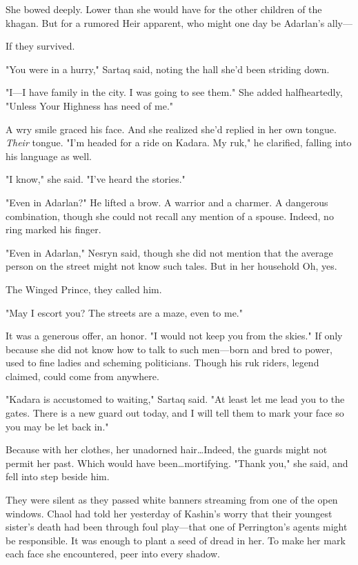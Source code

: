 She bowed deeply. Lower than she would have for the other children of the khagan. But for a rumored Heir apparent, who might one day be Adarlan's ally---

If they survived.

"You were in a hurry," Sartaq said, noting the hall she'd been striding down.

"I---I have family in the city. I was going to see them." She added halfheartedly, "Unless Your Highness has need of me."

A wry smile graced his face. And she realized she'd replied in her own tongue. \emph{Their} tongue. "I'm headed for a ride on Kadara. My ruk," he clarified, falling into his language as well.

"I know," she said. "I've heard the stories."

"Even in Adarlan?" He lifted a brow. A warrior and a charmer. A dangerous combination, though she could not recall any mention of a spouse. Indeed, no ring marked his finger.

"Even in Adarlan," Nesryn said, though she did not mention that the average person on the street might not know such tales. But in her household  Oh, yes.

The Winged Prince, they called him.

"May I escort you? The streets are a maze, even to me."

It was a generous offer, an honor. "I would not keep you from the skies." If only because she did not know how to talk to such men---born and bred to power, used to fine ladies and scheming politicians. Though his ruk riders, legend claimed, could come from anywhere.

"Kadara is accustomed to waiting," Sartaq said. "At least let me lead you to the gates. There is a new guard out today, and I will tell them to mark your face so you may be let back in."

Because with her clothes, her unadorned hair\ldots Indeed, the guards might not permit her past. Which would have been\ldots mortifying. "Thank you," she said, and fell into step beside him.

They were silent as they passed white banners streaming from one of the open windows. Chaol had told her yesterday of Kashin's worry that their youngest sister's death had been through foul play---that one of Perrington's agents might be responsible. It was enough to plant a seed of dread in her. To make her mark each face she encountered, peer into every shadow.

